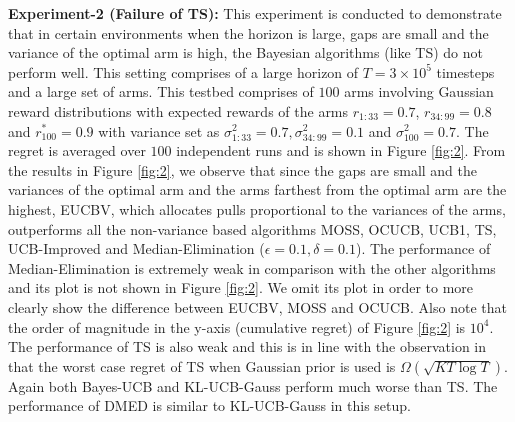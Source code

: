 \textbf{Experiment-2 (Failure of TS):} This experiment is conducted to demonstrate that in certain environments when the horizon is large, gaps are small and the variance of the optimal arm is high, the Bayesian algorithms (like TS) do not perform well. This setting comprises of a large horizon of $T = 3\times 10^{5}$ timesteps and a large set of arms. This testbed comprises of $100$ arms involving Gaussian reward distributions with expected rewards of the arms $r_{1:33}=0.7$, $r_{34:99}=0.8$ and $r^{*}_{100}=0.9$ with variance set as $\sigma_{1:33}^{2} = 0.7,\sigma_{34:99}^{2} = 0.1$ and $\sigma^{2}_{100}=0.7$. The regret is averaged over $100$ independent runs and is shown in Figure \ref{fig:2}. From the results in Figure \ref{fig:2}, we observe that since the gaps are small and the variances of the optimal arm and the arms farthest from the optimal arm are the highest, EUCBV, which allocates pulls proportional to the variances of the arms,  outperforms all the non-variance based algorithms MOSS, OCUCB, UCB1, TS, UCB-Improved and Median-Elimination ($\epsilon=0.1,\delta=0.1$). The performance of Median-Elimination is extremely weak in comparison with the other algorithms and its plot is not shown in Figure \ref{fig:2}. We omit its plot in order to more clearly show the difference between EUCBV, MOSS and OCUCB. Also note that the order of magnitude in the y-axis (cumulative regret) of Figure \ref{fig:2} is $10^4$. The performance of TS is also weak and this is in line with the observation in  \cite{lattimore2015optimally} that the worst case regret of TS when Gaussian prior is used is $\Omega\left( \sqrt{KT\log T}\right)$. Again both Bayes-UCB and KL-UCB-Gauss perform much worse than TS. The performance of DMED is similar to KL-UCB-Gauss in this setup. 

